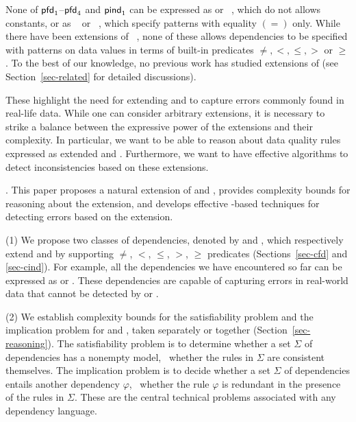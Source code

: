 \vspace{-0.5ex}

None of ${\mathsf{pfd}}_1$--${\mathsf{pfd}}_4$ and ${\mathsf{pind}}_1$
can be expressed as
\FDs or \INDs~\cite{AbHuVi1995}, which do not allows constants,
or as \CFDs~\cite{CFDs} or \CINDs~\cite{tcs-CINDs}, which specify
patterns with  equality $(=)$ only. While there have been
extensions of \CFDs~\cite{icde08,divesh08,ChenFM09}, none of these allows
dependencies to be specified with patterns on data values in terms of
built-in predicates $\ne, <, \le, >$ or $\ge$.  To the best of our
knowledge, no previous work has studied extensions of \CINDs
(see Section~\ref{sec-related} for detailed discussions).

These highlight the
need for extending \CFDs and \CINDs to capture errors
commonly found in real-life data.
While one can consider arbitrary extensions,
it is necessary to strike a balance between the expressive power
of the extensions and their complexity.
In particular, we want to be able to reason about data quality rules
expressed as extended \CFDs and \CINDs. Furthermore, we want to
have effective algorithms to detect inconsistencies
based on these extensions.


. This paper proposes
a natural extension of \CFDs and \CINDs, provides complexity
bounds for reasoning about the extension, and develops
effective \SQL-based techniques for detecting errors
based on the extension.

\sstab
\noindent(1) We propose two classes of dependencies, denoted by
\pCFDs and \pCINDs, which respectively extend \CFDs and \CINDs by supporting
$\ne$, $<$, $\le$, $>$, $\ge$ predicates (Sections~\ref{sec-cfd} and \ref{sec-cind}). For example, all
the dependencies we have encountered so far can be expressed as
\pCFDs or \pCINDs. These dependencies are capable of capturing
errors
in real-world data that cannot be detected by \CFDs or \CINDs.

\sstab
\noindent(2) We establish complexity bounds for  the satisfiability
problem and the implication problem for \pCFDs and \pCINDs,
taken separately or together (Section~\ref{sec-reasoning}). The
satisfiability problem is to determine whether a set $\Sigma$ of
dependencies has a nonempty model, \ie~whether the rules in $\Sigma$
are consistent themselves. The implication problem is to decide whether
a set $\Sigma$ of dependencies entails another dependency $\varphi$,
\ie~whether the rule $\varphi$ is redundant in the presence of
the rules in $\Sigma$. These are the central technical problems
associated with any dependency language.

